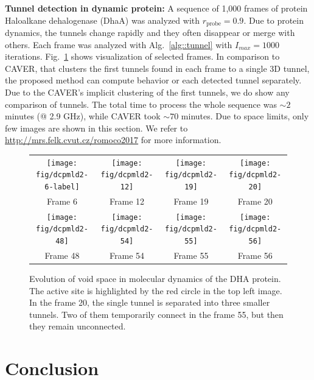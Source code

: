 \documentclass{llncs}
\def\Imax{I_{max}} %
\def\probe{r_{\mathrm{probe}}}
\begin{document}
{\bf Tunnel detection in dynamic protein: }
A sequence of 1,000 frames of protein Haloalkane dehalogenase (DhaA) was analyzed with $\probe=0.9$.
Due to protein dynamics, the tunnels change rapidly and they often disappear or merge with others.
Each frame was analyzed with Alg.~\ref{alg::tunnel} with $\Imax=1000$ iterations.
Fig.~\ref{fig::dyn} shows visualization of selected frames.
In comparison to CAVER, that clusters the first tunnels found in each frame to a single 3D tunnel, the proposed
method can compute behavior or each detected tunnel separately.
Due to the CAVER's implicit clustering of the first tunnels, we do show any comparison of tunnels.
The total time to process the whole sequence was $\sim\!\!2$ minutes (@ 2.9 GHz), while CAVER took $\sim\!70$ minutes.
Due to space limits, only few images are shown in this section. 
We refer to \url{http://mrs.felk.cvut.cz/romoco2017} for more information.

\begin{figure}
\centering
\begin{tabular}{cccc}
\texttt{[image: fig/dcpmld2-6-label]} &
\texttt{[image: fig/dcpmld2-12]} &
\texttt{[image: fig/dcpmld2-19]} &
\texttt{[image: fig/dcpmld2-20]} \\
Frame 6 & Frame 12 & Frame 19 & Frame 20 \\                       
\texttt{[image: fig/dcpmld2-48]} &
\texttt{[image: fig/dcpmld2-54]} &
\texttt{[image: fig/dcpmld2-55]} &
\texttt{[image: fig/dcpmld2-56]} \\
Frame 48 & Frame 54 & Frame 55 & Frame 56 \\                       
\end{tabular}
\caption{\label{fig::dyn}
Evolution of void space in molecular dynamics of the DHA protein. 
The active site is highlighted by the red circle in the top left image.
In the frame 20, the single tunnel is separated into three smaller tunnels.
Two of them temporarily connect in the frame 55, but then they remain unconnected.
}
\end{figure}


\section{Conclusion }
\end{document}
